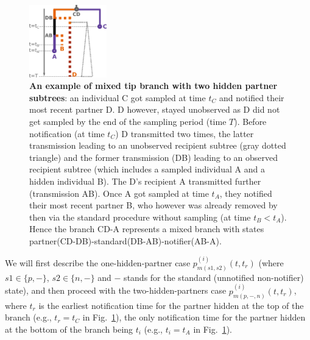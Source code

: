 \documentclass[10pt,letterpaper]{article}
\begin{document}
\begin{figure}[h]
\centering 
\includegraphics[width=0.3\textwidth]{Fig_mixed}
\caption{\textbf{An example of mixed tip branch with two hidden partner subtrees}: an individual C got sampled at time $t_C$ and notified their most recent partner D. D however, stayed unobserved as D did not get sampled by the end of the sampling period (time $T$). Before notification (at time $t_C$) D transmitted two times, the latter transmission leading to an unobserved recipient subtree (gray dotted triangle) and the former transmission (DB) leading to an observed recipient subtree (which includes a sampled individual A and a hidden individual B). The D's recipient A transmitted further (transmission AB). Once A got sampled at time $t_A$, they notified their most recent partner B, who however was already removed by then via the standard procedure without sampling (at time $t_B < t_A$). Hence the branch CD-A represents a mixed branch with states partner(CD-DB)-standard(DB-AB)-notifier(AB-A). }
\label{fig:pn-mixed} 
\end{figure}


We will first describe the one-hidden-partner case $p_{m(s1,s2)}^{(i)}(t,t_r)$ (where $s1 \in \{p, -\}$, $s2 \in \{n, -\}$ and $-$ stands for the standard (unnotified non-notifier) state), and then proceed with the two-hidden-partners case $p_{m(p,-,n)}^{(i)}(t,t_{r})$, where $t_{r}$ is the earliest notification time for the partner hidden at the top of the branch (e.g., $t_r=t_C$ in Fig.~\ref{fig:pn-mixed}), the only notification time for the partner hidden at the bottom of the branch being $t_i$  (e.g., $t_i=t_A$ in Fig.~\ref{fig:pn-mixed}).
\end{document}
